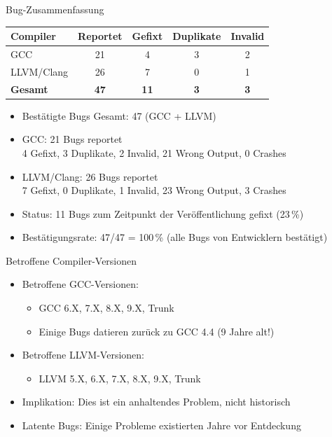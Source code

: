 ﻿\documentclass{beamer}
\begin{document}
\begin{frame}{Bug-Zusammenfassung}
  \begin{center}
    \begin{tabular}{|l|c|c|c|c|}
      \hline
      \textbf{Compiler} & \textbf{Reportet} & \textbf{Gefixt} & \textbf{Duplikate} & \textbf{Invalid} \\
      \hline
      GCC & 21 & 4 & 3 & 2 \\
      \hline
      LLVM/Clang & 26 & 7 & 0 & 1 \\
      \hline
      \textbf{Gesamt} & \textbf{47} & \textbf{11} & \textbf{3} & \textbf{3} \\
      \hline
    \end{tabular}
  \end{center}
  \vspace{0.3cm}
  \begin{itemize}
    \item Best\"atigte Bugs Gesamt: 47 (GCC + LLVM)
    \item GCC: 21 Bugs reportet \\
      4 Gefixt, 3 Duplikate, 2 Invalid, 21 Wrong Output, 0 Crashes
    \item LLVM/Clang: 26 Bugs reportet \\
      7 Gefixt, 0 Duplikate, 1 Invalid, 23 Wrong Output, 3 Crashes
    \item Status: 11 Bugs zum Zeitpunkt der Ver\"offentlichung gefixt (23\,\%)
    \item Best\"atigungsrate: 47/47 = 100\,\% (alle Bugs von Entwicklern best\"atigt)
  \end{itemize}
\end{frame}

\begin{frame}{Betroffene Compiler-Versionen}
  \begin{itemize}
    \item Betroffene GCC-Versionen:
      \begin{itemize}
        \item GCC 6.X, 7.X, 8.X, 9.X, Trunk
        \item Einige Bugs datieren zur\"uck zu GCC 4.4 (9 Jahre alt!)
      \end{itemize}
    \item Betroffene LLVM-Versionen:
      \begin{itemize}
        \item LLVM 5.X, 6.X, 7.X, 8.X, 9.X, Trunk
      \end{itemize}
    \item Implikation: Dies ist ein anhaltendes Problem, nicht historisch
    \item Latente Bugs: Einige Probleme existierten Jahre vor Entdeckung
  \end{itemize}
\end{frame}
\end{document}
